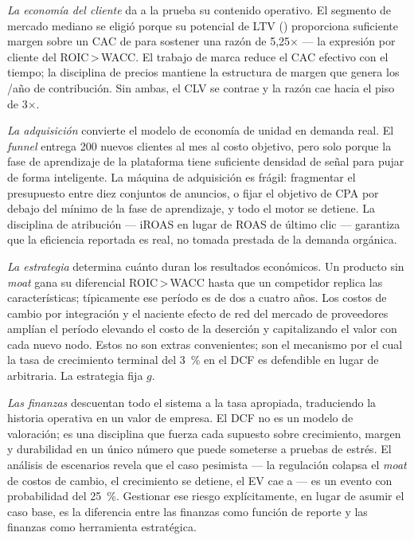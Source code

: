 \emph{La economía del cliente} da a la prueba su contenido operativo. El segmento de mercado
mediano se eligió porque su potencial de LTV () proporciona suficiente margen sobre
un CAC de  para sostener una razón de 5,25× --- la expresión por cliente del ROIC\,>\,WACC.
El trabajo de marca reduce el CAC efectivo con el tiempo; la disciplina de precios mantiene la
estructura de margen que genera los /año de contribución. Sin ambas, el CLV se
contrae y la razón cae hacia el piso de 3×.

\emph{La adquisición} convierte el modelo de economía de unidad en demanda real. El \emph{funnel}
entrega 200 nuevos clientes al mes al costo objetivo, pero solo porque la fase de aprendizaje de
la plataforma tiene suficiente densidad de señal para pujar de forma inteligente. La máquina de
adquisición es frágil: fragmentar el presupuesto entre diez conjuntos de anuncios, o fijar el
objetivo de CPA por debajo del mínimo de la fase de aprendizaje, y todo el motor se detiene. La
disciplina de atribución --- iROAS en lugar de ROAS de último clic --- garantiza que la eficiencia
reportada es real, no tomada prestada de la demanda orgánica.

\emph{La estrategia} determina cuánto duran los resultados económicos. Un producto sin
\emph{moat} gana su diferencial ROIC\,>\,WACC hasta que un competidor replica las características;
típicamente ese período es de dos a cuatro años. Los costos de cambio por integración y el
naciente efecto de red del mercado de proveedores amplían el período elevando el costo de la
deserción y capitalizando el valor con cada nuevo nodo. Estos no son extras convenientes; son el
mecanismo por el cual la tasa de crecimiento terminal del \qty{3}{\percent} en el DCF es
defendible en lugar de arbitraria. La estrategia fija $g$.

\emph{Las finanzas} descuentan todo el sistema a la tasa apropiada, traduciendo la historia
operativa en un valor de empresa. El DCF no es un modelo de valoración; es una disciplina que
fuerza cada supuesto sobre crecimiento, margen y durabilidad en un único número que puede
someterse a pruebas de estrés. El análisis de escenarios revela que el caso pesimista ---
la regulación colapsa el \emph{moat} de costos de cambio, el crecimiento se detiene, el EV cae
a  --- es un evento con probabilidad del \qty{25}{\percent}. Gestionar ese riesgo
explícitamente, en lugar de asumir el caso base, es la diferencia entre las finanzas como función
de reporte y las finanzas como herramienta estratégica.

